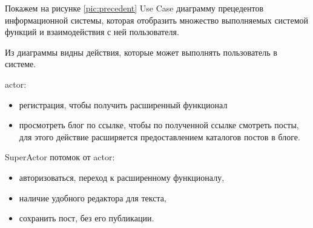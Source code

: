 Покажем на рисунке \ref{pic:precedent} Use Case диаграмму прецедентов информационной системы, которая отобразить множество выполняемых системой функций и взаимодействия с ней пользователя. 
 

Из диаграммы видны действия, которые может выполнять пользователь в системе.

actor:
\begin{itemize}
	\item регистрация, чтобы получить расширенный функционал 
	\item просмотреть блог по ссылке, чтобы по полученной ссылке смотреть посты, для этого действие расширяется предоставлением каталогов постов в блоге.
\end{itemize}

SuperActor потомок от actor:
\begin{itemize}   
	\item авторизоваться, переход к расширенному функционалу,
	\item наличие удобного редактора для текста,
	\item сохранить пост, без его публикации. 
\end{itemize}





\pagebreak